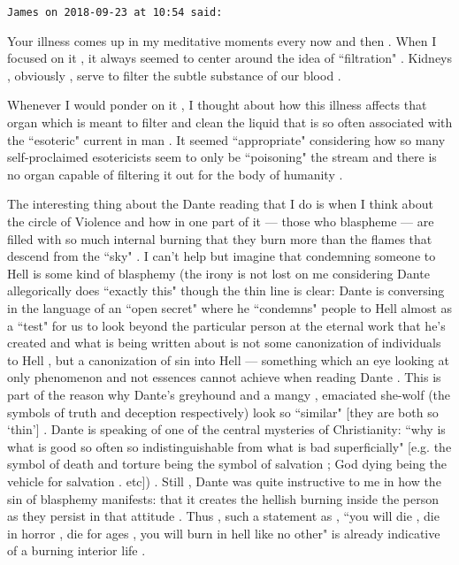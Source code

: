 \begin{footnotesize}\begin{sffamily}



\texttt{James on 2018-09-23 at 10:54 said: }

Your illness comes up in my meditative moments every now and then . When I focused on it , it always seemed to center around the idea of ``filtration" . Kidneys , obviously , serve to filter the subtle substance of our blood .

Whenever I would ponder on it , I thought about how this illness affects that organ which is meant to filter and clean the liquid that is so often associated with the ``esoteric" current in man . It seemed ``appropriate" considering how so many self-proclaimed esotericists seem to only be ``poisoning" the stream and there is no organ capable of filtering it out for the body of humanity .

The interesting thing about the Dante reading that I do is when I think about the circle of Violence and how in one part of it — those who blaspheme — are filled with so much internal burning that they burn more than the flames that descend from the ``sky" . I can't help but imagine that condemning someone to Hell is some kind of blasphemy (the irony is not lost on me considering Dante allegorically does ``exactly this" though the thin line is clear: Dante is conversing in the language of an ``open secret" where he ``condemns" people to Hell almost as a ``test" for us to look beyond the particular person at the eternal work that he's created and what is being written about is not some canonization of individuals to Hell , but a canonization of sin into Hell — something which an eye looking at only phenomenon and not essences cannot achieve when reading Dante . This is part of the reason why Dante's greyhound and a mangy , emaciated she-wolf (the symbols of truth and deception respectively) look so ``similar" [they are both so `thin’] . Dante is speaking of one of the central mysteries of Christianity: ``why is what is good so often so indistinguishable from what is bad superficially" [e.g. the symbol of death and torture being the symbol of salvation ; God dying being the vehicle for salvation . etc]) . Still , Dante was quite instructive to me in how the sin of blasphemy manifests: that it creates the hellish burning inside the person as they persist in that attitude . Thus , such a statement as , ``you will die , die in horror , die for ages , you will burn in hell like no other" is already indicative of a burning interior life .


\end{sffamily}
\end{footnotesize}

